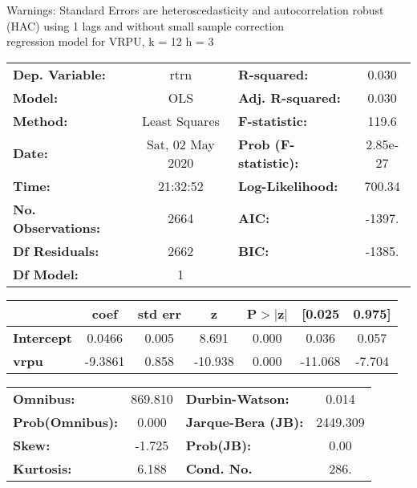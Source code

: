 Warnings: \newline
 [1] Standard Errors are heteroscedasticity and autocorrelation robust (HAC) using 1 lags and without small sample correction\\ 

regression model for VRPU, k = 12 h = 3\begin{center}
\begin{tabular}{lclc}
\toprule
\textbf{Dep. Variable:}    &       rtrn       & \textbf{  R-squared:         } &     0.030   \\
\textbf{Model:}            &       OLS        & \textbf{  Adj. R-squared:    } &     0.030   \\
\textbf{Method:}           &  Least Squares   & \textbf{  F-statistic:       } &     119.6   \\
\textbf{Date:}             & Sat, 02 May 2020 & \textbf{  Prob (F-statistic):} &  2.85e-27   \\
\textbf{Time:}             &     21:32:52     & \textbf{  Log-Likelihood:    } &    700.34   \\
\textbf{No. Observations:} &        2664      & \textbf{  AIC:               } &    -1397.   \\
\textbf{Df Residuals:}     &        2662      & \textbf{  BIC:               } &    -1385.   \\
\textbf{Df Model:}         &           1      & \textbf{                     } &             \\
\bottomrule
\end{tabular}
\begin{tabular}{lcccccc}
                   & \textbf{coef} & \textbf{std err} & \textbf{z} & \textbf{P$> |$z$|$} & \textbf{[0.025} & \textbf{0.975]}  \\
\midrule
\textbf{Intercept} &       0.0466  &        0.005     &     8.691  &         0.000        &        0.036    &        0.057     \\
\textbf{vrpu}      &      -9.3861  &        0.858     &   -10.938  &         0.000        &      -11.068    &       -7.704     \\
\bottomrule
\end{tabular}
\begin{tabular}{lclc}
\textbf{Omnibus:}       & 869.810 & \textbf{  Durbin-Watson:     } &    0.014  \\
\textbf{Prob(Omnibus):} &   0.000 & \textbf{  Jarque-Bera (JB):  } & 2449.309  \\
\textbf{Skew:}          &  -1.725 & \textbf{  Prob(JB):          } &     0.00  \\
\textbf{Kurtosis:}      &   6.188 & \textbf{  Cond. No.          } &     286.  \\
\bottomrule
\end{tabular}
\end{center}

